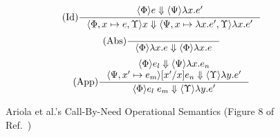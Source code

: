 \begin{figure}
\begin{align*}
\tag{Id} \inference
{\langle \Phi \rangle e \Downarrow \langle \Psi \rangle \lambda x.e'}
{\langle \Phi, x \mapsto e, \Upsilon \rangle x \Downarrow \langle \Psi, x
\mapsto \lambda x.e', \Upsilon \rangle \lambda x.e'}
\end{align*}
\begin{align*}
\tag{Abs} \inference 
{}
{\langle \Phi \rangle \lambda x . e \Downarrow \langle \Phi \rangle \lambda x.e}
\end{align*}
\begin{align*}
\tag{App} \inference
{\langle \Phi \rangle e_l \Downarrow \langle \Psi \rangle \lambda 
x.e_n \\ \langle \Psi, x' \mapsto e_m \rangle [x'/x]e_n \Downarrow \langle
\Upsilon \rangle \lambda y.e'}
{\langle \Phi \rangle e_l \; e_m \Downarrow \langle \Upsilon \rangle \lambda y.e'}
\end{align*}
\caption{Ariola et al.'s Call-By-Need Operational Semantics (Figure 8 of Ref.~\cite{ariola1995call})}
\label{fig:cbn}
\end{figure}
